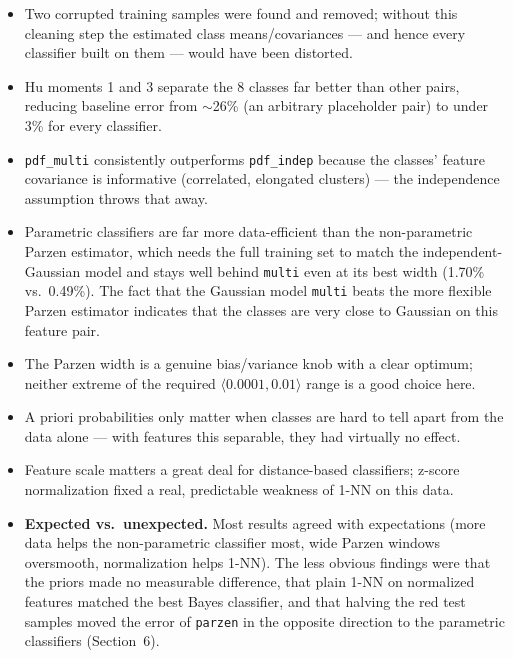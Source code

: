 \documentclass[11pt,a4paper]{article}
\begin{document}
\begin{itemize}[leftmargin=1.4em]
  \item Two corrupted training samples were found and removed; without this
    cleaning step the estimated class means/covariances --- and hence every
    classifier built on them --- would have been distorted.
  \item Hu moments 1 and 3 separate the 8 classes far better than other
    pairs, reducing baseline error from $\sim$26\% (an arbitrary placeholder
    pair) to under 3\% for every classifier.
  \item \texttt{pdf\_multi} consistently outperforms \texttt{pdf\_indep}
    because the classes' feature covariance is informative (correlated,
    elongated clusters) --- the independence assumption throws that away.
  \item Parametric classifiers are far more data-efficient than the
    non-parametric Parzen estimator, which needs the full training set to
    match the independent-Gaussian model and stays well behind
    \texttt{multi} even at its best width (1.70\% vs.\ 0.49\%). The fact that
    the Gaussian model \texttt{multi} beats the more flexible Parzen
    estimator indicates that the classes are very close to Gaussian on this
    feature pair.
  \item The Parzen width is a genuine bias/variance knob with a clear
    optimum; neither extreme of the required $\langle 0.0001, 0.01\rangle$
    range is a good choice here.
  \item A priori probabilities only matter when classes are hard to tell
    apart from the data alone --- with features this separable, they had
    virtually no effect.
  \item Feature scale matters a great deal for distance-based classifiers;
    z-score normalization fixed a real, predictable weakness of 1-NN on
    this data.
  \item \textbf{Expected vs.\ unexpected.} Most results agreed with
    expectations (more data helps the non-parametric classifier most,
    wide Parzen windows oversmooth, normalization helps 1-NN). The
    less obvious findings were that the priors made no measurable
    difference, that plain 1-NN on normalized features matched the best
    Bayes classifier, and that halving the red test samples moved the
    error of \texttt{parzen} in the opposite direction to the parametric
    classifiers (Section~6).
\end{itemize}
\end{document}
